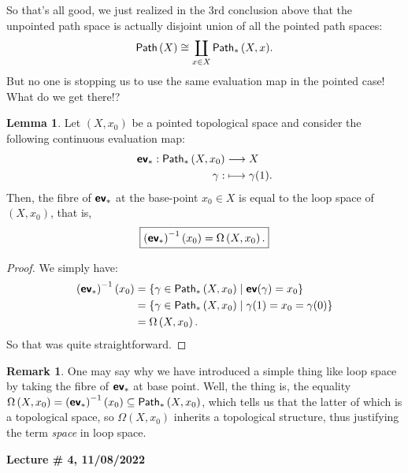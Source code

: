 \documentclass[letterpaper,11pt,twoside]{article}
\theoremstyle{definition}
\theoremstyle{definition}
\theoremstyle{definition}
\newtheorem{remark}[proposition]{\textbf{Remark}}
\theoremstyle{definition}
\newtheorem{lemma}[proposition]{\textbf{Lemma}}
\theoremstyle{definition}
\theoremstyle{definition}
\theoremstyle{remark}
\theoremstyle{definition}
\newcommand{\isom}{\cong}
\newcommand{\newlecture}[2]{\begin{center}
    \textbf{Lecture \# #1, #2}
\end{center}}
\newcommand{\inv}[1]{\left(#1\right)^{-1}}
\newcommand{\upps}[1]{{\fontfamily{lmss}\selectfont 
		\text{Path}\left(#1\right)
}}
\newcommand{\pps}[1]{{\fontfamily{lmss}\selectfont 
		\text{Path}_{*}\left(#1\right)
}}
\newcommand{\ev}[0]{{\fontfamily{lmss}\selectfont 
        \textbf{ev}
}}
\newcommand{\loops}[1]{\Omega\left(#1\right)}
\begin{document}
    So that's all good, we just realized in the 3rd conclusion above that the unpointed path space is actually disjoint union of all the pointed path spaces:
    \begin{align*}
        \upps{X} \isom \coprod_{x\in X} \pps{X,x}.
    \end{align*}
	But no one is stopping us to use the same evaluation map in the pointed case! What do we get there!?
	\begin{lemma}
	Let $(X,x_0)$ be a pointed topological space and consider the following continuous evaluation map:
	\begin{align*}
	    \ev_* : \pps{X,x_0} &\longrightarrow X\\
	    \gamma : &\longmapsto \gamma(1).
	\end{align*}
	Then, the fibre of $\ev_*$ at the base-point $x_0\in X$ is equal to the loop space of $(X,x_0)$, that is,
	\begin{align*}
	    \boxed{\inv{\ev_*}(x_0) = \loops{X,x_0}.}
	\end{align*}
	\end{lemma}
	\begin{proof}
	We simply have:
	\begin{align*}
	    \inv{\ev_*}(x_0) &= \{\gamma \in \pps{X,x_0}\;\vert\; \ev(\gamma) = x_0\}\\
	    &= \{\gamma \in \pps{X,x_0}\;\vert\; \gamma(1) = x_0 = \gamma(0)\}\\
	    &= \loops{X,x_0}.
	\end{align*}
    So that was quite straightforward.
	\end{proof}
	\begin{remark}
	One may say why we have introduced a simple thing like loop space by taking the fibre of $\ev_*$ at base point. Well, the thing is, the equality $\loops{X,x_0} = \inv{\ev_*}(x_0) \subseteq \pps{X,x_0}$, which tells us that the latter of which is a topological space, so $\loops{X,x_0}$ inherits a topological structure, thus justifying the term \textit{space} in loop space.
	\end{remark}
	
	\newlecture{4}{11/08/2022}
\end{document}
